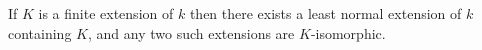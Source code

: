 If $K$ is a finite extension of $k$ then there exists a least normal extension of $k$ containing $K$, and any two such extensions are $K$-isomorphic.
